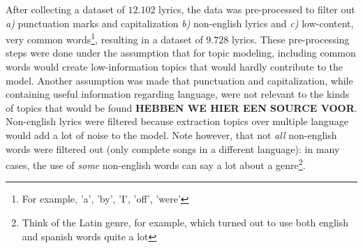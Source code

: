 After collecting a dataset of $12.102$ lyrics, the data was pre-processed to filter out \textit{a)} punctuation marks and capitalization \textit{b)} non-english lyrics and \textit{c)} low-content, very common words\footnote{For example, 'a', 'by', 'I', 'off', 'were'}, resulting in a dataset of $9.728$ lyrics. These pre-processing steps were done under the assumption that for topic modeling, including common words would create low-information topics that would hardly contribute to the model. Another assumption was made that punctuation and capitalization, while containing useful information regarding language, were not relevant to the kinds of topics that would be found \textbf{HEBBEN WE HIER EEN SOURCE VOOR}. Non-english lyrics were filtered because extraction topics over multiple language would add a lot of noise to the model. Note however, that not \textit{all} non-english words were filtered out (only complete songs in a different language): in many cases, the use of \textit{some} non-english words can say a lot about a genre\footnote{Think of the Latin genre, for example, which turned out to use both english and spanish words quite a lot}. 


